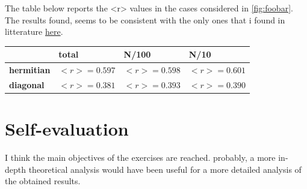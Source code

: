 \documentclass[prb,9pt,notitlepage]{revtex4-1}
\begin{document}
The table below reports the <r> values in the cases considered in \ref{fig:foobar}. The results found, seems to be consistent with the only ones that i found in litterature \href{https://arxiv.org/abs/1212.5611v1}{here}.

\begin{table}[H]
\begin{tabular}{l|l|l|l|}
                  & \textbf{total} & \textbf{N/100} & \textbf{N/10} \\ \hline
\textbf{hermitian} & $<r> = 0.597$  & $<r> =0.598$   & $<r> =0.601$  \\ \hline
\textbf{diagonal}  & $<r> =0.381$   & $<r> =0.393$   & $<r> =0.390$
\end{tabular}
\end{table}


\section{Self-evaluation}
I think the main objectives of the exercises are reached. probably, a more in-depth theoretical analysis would have been useful for a more detailed analysis of the obtained results.
\end{document}

